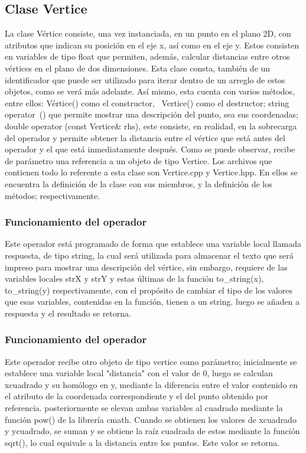 \documentclass[11pt]{article}
\begin{document}
\subsection{Clase Vertice}

	La clase Vértice consiste, una vez instanciada, en un punto en el plano 2D, con atributos que indican su posición en el eje x, así como en el eje y. Estos consisten en variables de tipo float que permiten, además, calcular distancias entre otros vértices en el plano de dos dimensiones. 
	Esta clase consta, también de un identificador que puede ser utilizado para iterar dentro de un arreglo de estos objetos, como se verá más adelante. Así mismo, esta cuenta con varios métodos, entre ellos: Vértice() como el constructor, ~Vertice() como el destructor; string operator~() que permite mostrar una descripción del punto, sea sus coordenadas; double operator\>\> (const Vertice\& rhs), este consiste, en realidad, en la sobrecarga del operador \>\> y permite obtener la distancia entre el vértice que está antes del operador y el que está inmediatamente después. Como se puede observar, recibe de parámetro una referencia a un objeto de tipo Vertice. 
	Los archivos que contienen todo lo referente a esta clase son Vertice.cpp y Vertice.hpp. En ellos se encuentra la definición de la clase con sus miembros, y la definición de los métodos; respectivamente.

\subsubsection{Funcionamiento del operador~}
	Este operador está programado de forma que establece una variable local llamada respuesta, de tipo string, la cual será utilizada para almacenar el texto que será impreso para mostrar una descripción del vértice, sin embargo, requiere de las variables locales strX y strY y estas últimas de la función to\_string(x), to\_string(y) respectivamente, con el propósito de cambiar el tipo de los valores que esas variables, contenidas en la función, tienen a un string. luego se añaden a respuesta y el resultado se retorna.

\subsubsection{Funcionamiento del operador\>\>}
	Este operador recibe otro objeto de tipo vertice como parámetro; inicialmente se establece una variable local "distancia" con el valor de 0, luego se calculan xcuadrado y su homólogo en y, mediante la diferencia entre el valor contenido en el atributo de la coordenada correspondiente y el del punto obtenido por referencia. posteriormente se elevan ambas variables al cuadrado mediante la función pow() de la librería cmath.
	Cuando se obtienen  los valores de xcuadrado y ycuadrado, se suman y se obtiene la raíz cuadrada de 
estos mediante la función sqrt(), lo cual equivale a la distancia entre los puntos. Este valor se retorna.
\end{document}
